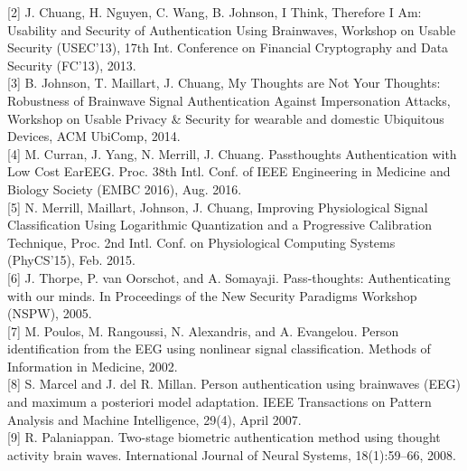 \documentclass[11pt]{article}
\begin{document}
[2]
J. Chuang, H. Nguyen, C. Wang, B. Johnson, I Think, Therefore I Am: Usability and
Security of Authentication Using Brainwaves, Workshop on Usable Security (USEC'13),
17th Int. Conference on Financial Cryptography and Data Security (FC’13), 2013.
\hspace{0pt} \\

[3]
B. Johnson, T. Maillart, J. Chuang, My Thoughts are Not Your Thoughts: Robustness of
Brainwave Signal Authentication Against Impersonation Attacks, Workshop on Usable
Privacy \& Security for wearable and domestic Ubiquitous Devices, ACM UbiComp, 2014.
\hspace{0pt} \\

[4]
M. Curran, J. Yang, N. Merrill, J. Chuang. Passthoughts Authentication with Low Cost
EarEEG. Proc. 38th Intl. Conf. of IEEE Engineering in Medicine and Biology Society
(EMBC 2016), Aug. 2016.
\hspace{0pt} \\

[5]
N. Merrill, Maillart, Johnson, J. Chuang, Improving Physiological Signal Classification Using
Logarithmic Quantization and a Progressive Calibration Technique, Proc. 2nd Intl. Conf. on
Physiological Computing Systems (PhyCS'15), Feb. 2015.
\hspace{0pt} \\

[6]
J. Thorpe, P. van Oorschot, and A. Somayaji. Pass-thoughts: Authenticating with our
minds. In Proceedings of the New Security Paradigms Workshop (NSPW), 2005.
\hspace{0pt} \\

[7]
M. Poulos, M. Rangoussi, N. Alexandris, and A. Evangelou. Person identification from the
EEG using nonlinear signal classification. Methods of Information in Medicine, 2002.
\hspace{0pt} \\

[8]
S. Marcel and J. del R. Millan. Person authentication using brainwaves (EEG) and
maximum a posteriori model adaptation. IEEE Transactions on Pattern Analysis and
Machine Intelligence, 29(4), April 2007.
\hspace{0pt} \\

[9]
R. Palaniappan. Two-stage biometric authentication method using thought activity brain
waves. International Journal of Neural Systems, 18(1):59–66, 2008.
\hspace{0pt} \\
\end{document}
